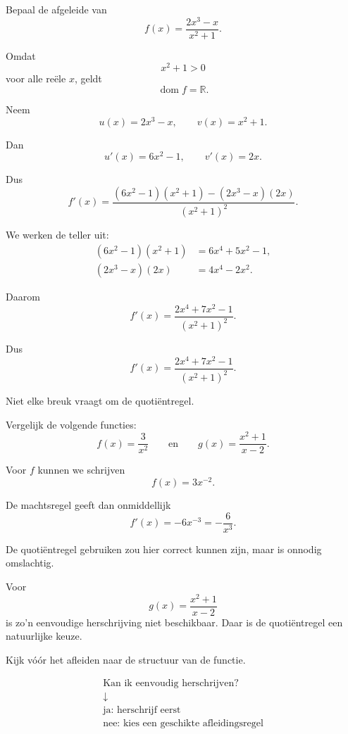 \documentclass{ximera}
\begin{document}
\begin{voorbeeld}
Bepaal de afgeleide van
\[
f(x)=\frac{2x^3-x}{x^2+1}.
\]

Omdat
\[
x^2+1>0
\]
voor alle reële $x$, geldt
\[
\operatorname{dom}f=\mathbb{R}.
\]

Neem
\[
u(x)=2x^3-x,
\qquad
v(x)=x^2+1.
\]

Dan
\[
u'(x)=6x^2-1,
\qquad
v'(x)=2x.
\]

Dus
\[
f'(x)
=
\frac{
(6x^2-1)(x^2+1)-(2x^3-x)(2x)
}{
(x^2+1)^2
}.
\]

We werken de teller uit:
\[
\begin{aligned}
(6x^2-1)(x^2+1)
&=6x^4+5x^2-1,\\
(2x^3-x)(2x)
&=4x^4-2x^2.
\end{aligned}
\]

Daarom
\[
f'(x)
=
\frac{
2x^4+7x^2-1
}{
(x^2+1)^2
}.
\]

Dus
\[
\boxed{
f'(x)=
\frac{2x^4+7x^2-1}{(x^2+1)^2}.
}
\]
\end{voorbeeld}




Niet elke breuk vraagt om de quotiëntregel.

Vergelijk de volgende functies:
\[
f(x)=\frac{3}{x^2}
\qquad\text{en}\qquad
g(x)=\frac{x^2+1}{x-2}.
\]

Voor $f$ kunnen we schrijven
\[
f(x)=3x^{-2}.
\]

De machtsregel geeft dan onmiddellijk
\[
f'(x)=-6x^{-3}
=
-\frac{6}{x^3}.
\]

De quotiëntregel gebruiken zou hier correct kunnen zijn, maar is
onnodig omslachtig.

Voor
\[
g(x)=\frac{x^2+1}{x-2}
\]
is zo'n eenvoudige herschrijving niet beschikbaar.
Daar is de quotiëntregel een natuurlijke keuze.


Kijk vóór het afleiden naar de structuur van de functie.

\[
\boxed{
\begin{array}{c}
\text{Kan ik eenvoudig herschrijven?}\\[1mm]
\downarrow\\[1mm]
\text{ja: herschrijf eerst}\\
\text{nee: kies een geschikte afleidingsregel}
\end{array}
}
\]
\end{document}
